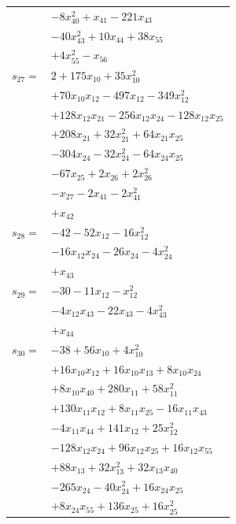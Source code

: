 \begin{longtable}{@{}r@{\;}l@{}}
 & \(\displaystyle -8x_{40}^{2} +x_{41} -221x_{43}\) \\
 & \(\displaystyle -40x_{43}^{2} +10x_{44} +38x_{55}\) \\
 & \(\displaystyle +4x_{55}^{2} -x_{56}\) \\[3pt]
\(s_{27}=\) & \(\displaystyle 2 +175x_{10} +35x_{10}^{2}\) \\
 & \(\displaystyle +70x_{10}x_{12} -497x_{12} -349x_{12}^{2}\) \\
 & \(\displaystyle +128x_{12}x_{21} -256x_{12}x_{24} -128x_{12}x_{25}\) \\
 & \(\displaystyle +208x_{21} +32x_{21}^{2} +64x_{21}x_{25}\) \\
 & \(\displaystyle -304x_{24} -32x_{24}^{2} -64x_{24}x_{25}\) \\
 & \(\displaystyle -67x_{25} +2x_{26} +2x_{26}^{2}\) \\
 & \(\displaystyle -x_{27} -2x_{41} -2x_{41}^{2}\) \\
 & \(\displaystyle +x_{42}\) \\[3pt]
\(s_{28}=\) & \(\displaystyle -42 -52x_{12} -16x_{12}^{2}\) \\
 & \(\displaystyle -16x_{12}x_{24} -26x_{24} -4x_{24}^{2}\) \\
 & \(\displaystyle +x_{43}\) \\[3pt]
\(s_{29}=\) & \(\displaystyle -30 -11x_{12} -x_{12}^{2}\) \\
 & \(\displaystyle -4x_{12}x_{43} -22x_{43} -4x_{43}^{2}\) \\
 & \(\displaystyle +x_{44}\) \\[3pt]
\(s_{30}=\) & \(\displaystyle -38 +56x_{10} +4x_{10}^{2}\) \\
 & \(\displaystyle +16x_{10}x_{12} +16x_{10}x_{13} +8x_{10}x_{24}\) \\
 & \(\displaystyle +8x_{10}x_{40} +280x_{11} +58x_{11}^{2}\) \\
 & \(\displaystyle +130x_{11}x_{12} +8x_{11}x_{25} -16x_{11}x_{43}\) \\
 & \(\displaystyle -4x_{11}x_{44} +141x_{12} +25x_{12}^{2}\) \\
 & \(\displaystyle -128x_{12}x_{24} +96x_{12}x_{25} +16x_{12}x_{55}\) \\
 & \(\displaystyle +88x_{13} +32x_{13}^{2} +32x_{13}x_{40}\) \\
 & \(\displaystyle -265x_{24} -40x_{24}^{2} +16x_{24}x_{25}\) \\
 & \(\displaystyle +8x_{24}x_{55} +136x_{25} +16x_{25}^{2}\) \\

\end{longtable}
